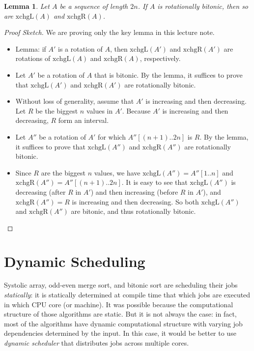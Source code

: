 \documentclass[11pt,a4paper,oneside,microtype,chapter,nokorean]{oblivoir}
\newtheorem{lemma}[theorem]{Lemma}
\begin{document}
\begin{lemma} Let $A$ be a sequence of length $2n$.  If $A$ is rotationally bitonic, then so are
  $\textrm{xchgL}(A)$ and $\textrm{xchgR}(A)$.
\end{lemma}
\begin{proof}[Proof Sketch]
  We are proving only the key lemma in this lecture note.

  \begin{itemize}
  \item Lemma: if $A'$ is a rotation of $A$, then $\textrm{xchgL}(A')$ and $\textrm{xchgR}(A')$ are
    rotations of $\textrm{xchgL}(A)$ and $\textrm{xchgR}(A)$, respectively.

  \item Let $A'$ be a rotation of $A$ that is bitonic.  By the lemma, it suffices to prove that
    $\textrm{xchgL}(A')$ and $\textrm{xchgR}(A')$ are rotationally bitonic.

  \item Without loss of generality, assume that $A'$ is increasing and then decreasing.  Let $R$ be
    the biggest $n$ values in $A'$.  Because $A'$ is increasing and then decreasing, $R$ form an
    interval.

  \item Let $A''$ be a rotation of $A'$ for which $A''[(n+1)..2n]$ is $R$.  By the lemma, it
    suffices to prove that $\textrm{xchgL}(A'')$ and $\textrm{xchgR}(A'')$ are rotationally bitonic.

  \item Since $R$ are the biggest $n$ values, we have $\textrm{xchgL}(A'') = A''[1..n]$ and
    $\textrm{xchgR}(A'') = A''[(n+1)..2n]$.  It is easy to see that $\textrm{xchgL}(A'')$ is
    decreasing (after $R$ in $A'$) and then increasing (before $R$ in $A'$), and
    $\textrm{xchgR}(A'') = R$ is increasing and then decreasing.  So both $\textrm{xchgL}(A'')$ and
    $\textrm{xchgR}(A'')$ are bitonic, and thus rotationally bitonic.
  \end{itemize}
\end{proof}



\section{Dynamic Scheduling}

Systolic array, odd-even merge sort, and bitonic sort are scheduling their jobs \emph{statically}:
it is statically determined at compile time that which jobs are executed in which CPU core (or
machine).  It was possible because the computational structure of those algorithms are static.  But
it is not always the case: in fact, most of the algorithms have dynamic computational structure with
varying job dependencies determined by the input.  In this case, it would be better to use
\emph{dynamic scheduler} that distributes jobs across multiple cores.
\end{document}
